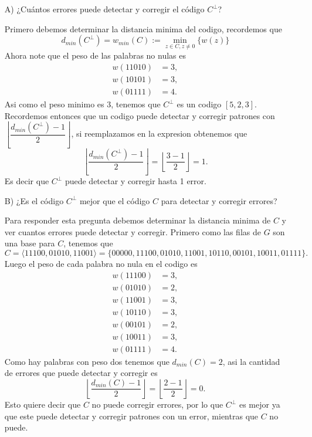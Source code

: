 \begin{itemize}
    \item[A)] ¿Cuántos errores puede detectar y corregir el código $C^\perp$?
    \begin{sols}
        Primero debemos determinar la distancia minima del codigo, recordemos que 
        $$d_{min}(C^\perp)=w_{min}(C):=\min_{z\in C, z\neq 0}\{w(z)\}$$
        Ahora note que el peso de las palabras no nulas es
        \begin{align*}
            w(11010)&=3,\\
            w(10101)&=3,\\
            w(01111)&=4.
        \end{align*}
        Asi como el peso minimo es $3$, tenemos que $C^\perp$ es un codigo $[5,2,3]$. Recordemos entonces que un codigo puede detectar y corregir patrones con $\left\lfloor\dfrac{d_{min}(C^\perp)-1}{2}\right\rfloor$, si reemplazamos en la expresion obtenemos que
        $$\left\lfloor\dfrac{d_{min}(C^\perp)-1}{2}\right\rfloor=\left\lfloor\dfrac{3-1}{2}\right\rfloor=1.$$
        Es decir que $C^\perp$ puede detectar y corregir hasta 1 error.
    \end{sols}
    \item[B)] ¿Es el código $C^\perp$ mejor que el código $C$ para detectar y corregir errores?
    \begin{sols}
        Para responder esta pregunta debemos determinar la distancia minima de $C$ y ver cuantos errores puede detectar y corregir. Primero como las filas de $G$ son una base para $C$, tenemos que
        $$C=\langle 11100,01010,11001\rangle=\{00000,11100,01010,11001,10110,00101,10011,01111\}.$$
        Luego el peso de cada palabra no nula en el codigo es
        \begin{align*}
            w(11100)&=3,\\w(01010)&=2,\\w(11001)&=3,\\w(10110)&=3,\\w(00101)&=2,\\w(10011)&=3,\\w(01111)&=4.
        \end{align*}
        Como hay palabras con peso dos tenemos que $d_{min}(C)=2$, asi la cantidad de errores que puede detectar y corregir es
         $$\left\lfloor\dfrac{d_{min}(C)-1}{2}\right\rfloor=\left\lfloor\dfrac{2-1}{2}\right\rfloor=0.$$
         Esto quiere decir que $C$ no puede corregir errores, por lo que $C^\perp$ es mejor ya que este puede detectar y corregir patrones con un error, mientras que $C$ no puede.


\end{sols}
\end{itemize}
